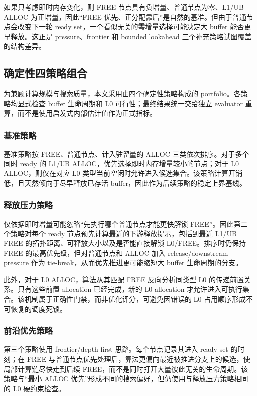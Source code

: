 如果只考虑即时内存变化，则 FREE 节点具有负增量、普通节点为零、L1/UB ALLOC 为正增量，因此“FREE 优先、正分配靠后”是自然的基准。但由于普通节点会改变下一轮 ready set，一个看似无关的零增量选择可能决定大 buffer 能否更早释放。这正是 pressure、frontier 和 bounded lookahead 三个补充策略试图覆盖的结构差异。

\subsection{确定性四策略组合}

为兼顾计算规模与搜索质量，本文采用由四个确定性策略构成的 portfolio。各策略均显式检查 buffer 生命周期和 L0 可行性；最终结果统一交给独立 evaluator 重算，而不是使用启发式内部估计值作为正式指标。

\subsubsection{基准策略}

基准策略按 FREE、普通节点、计入驻留量的 ALLOC 三类依次排序。对于多个同时 ready 的 L1/UB ALLOC，优先选择即时内存增量较小的节点；对于 L0 ALLOC，则仅在对应 L0 类型当前空闲时允许进入候选集合。该策略计算开销低，且天然倾向于尽早释放已存活 buffer，因此作为后续策略的稳定上界基线。

\subsubsection{释放压力策略}

仅依据即时增量可能忽略“先执行哪个普通节点才能更快解锁 FREE”。因此第二个策略对每个 ready 节点预先计算最近的下游释放提示，包括到最近 L1/UB FREE 的拓扑距离、可释放大小以及是否能直接解锁 L0/FREE。排序时仍保持 FREE 的最高优先级，但对普通节点和 ALLOC 加入 release/downstream pressure 作为 tie-break，从而优先推进更可能缩短大 buffer 生命周期的分支。

此外，对于 L0 ALLOC，算法从其匹配 FREE 反向分析同类型 L0 的传递前置关系。只有这些前置 allocation 已经完成，新的 L0 allocation 才允许进入可执行集合。该机制属于正确性门禁，而非优化评分，可避免因错误的 L0 占用顺序形成不可恢复的调度死锁。

\subsubsection{前沿优先策略}

第三个策略使用 frontier/depth-first 思路。每个节点记录其进入 ready set 的时刻；在 FREE 与普通节点优先处理后，算法更偏向最近被推进分支上的候选，使局部计算链尽快走到后续 FREE，而不是同时打开大量彼此无关的生命周期。该策略与“最小 ALLOC 优先”形成不同的搜索偏好，但仍使用与释放压力策略相同的 L0 硬约束检查。

